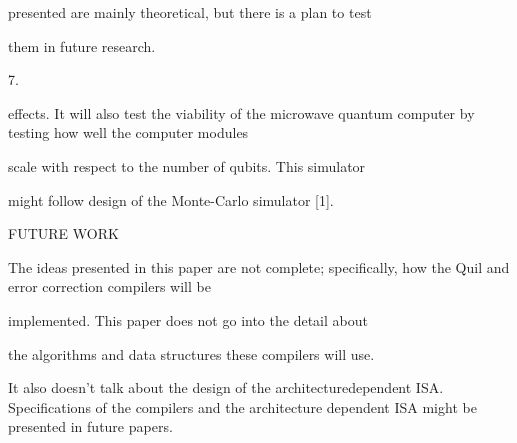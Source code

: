 \documentclass[a4paper,portrait,12pt]{article}
\begin{document}
\begin{flushleft}
presented are mainly theoretical, but there is a plan to test
\end{flushleft}


\begin{flushleft}
them in future research.
\end{flushleft}





7.





\begin{flushleft}
effects. It will also test the viability of the microwave quantum computer by testing how well the computer modules
\end{flushleft}


\begin{flushleft}
scale with respect to the number of qubits. This simulator
\end{flushleft}


\begin{flushleft}
might follow design of the Monte-Carlo simulator [1].
\end{flushleft}





\begin{flushleft}
FUTURE WORK
\end{flushleft}





\begin{flushleft}
The ideas presented in this paper are not complete; specifically, how the Quil and error correction compilers will be
\end{flushleft}


\begin{flushleft}
implemented. This paper does not go into the detail about
\end{flushleft}


\begin{flushleft}
the algorithms and data structures these compilers will use.
\end{flushleft}


\begin{flushleft}
It also doesn't talk about the design of the architecturedependent ISA. Specifications of the compilers and the architecture dependent ISA might be presented in future papers.
\end{flushleft}
\end{document}
